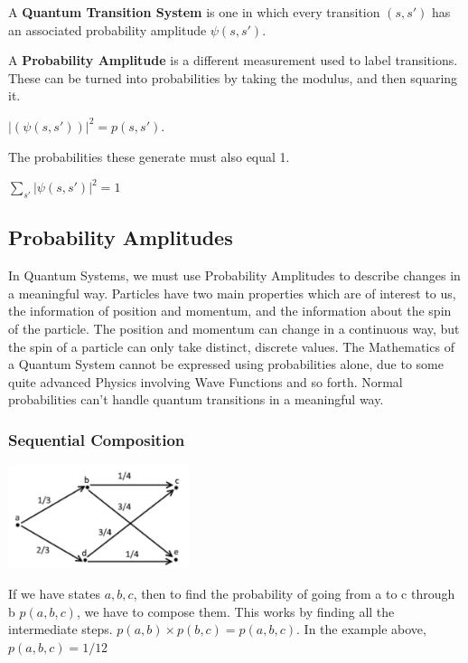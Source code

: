 \documentclass[12pt]{article}
\begin{document}
A \textbf{Quantum Transition System} is one in which every transition $(s, s')$ has an associated probability amplitude $\psi(s, s')$.

A \textbf{Probability Amplitude} is a different measurement used to label transitions. These can be turned into probabilities by taking the modulus, and then squaring it. 

\begin{center}
	$\lvert (\psi(s, s')) \rvert^2 = p(s, s')$. 
\end{center}

The probabilities these generate must also equal 1.

\begin{center}
	$\sum_{s'} \lvert \psi(s,s') \rvert^2 = 1$
\end{center}

\subsection{Probability Amplitudes}

In Quantum Systems, we must use Probability Amplitudes to describe changes in a meaningful way. Particles have two main properties which are of interest to us, the information of position and momentum, and the information about the spin of the particle. The position and momentum can change in a continuous way, but the spin of a particle can only take distinct, discrete values. The Mathematics of a Quantum System cannot be expressed using probabilities alone, due to some quite advanced Physics involving Wave Functions and so forth. Normal probabilities can't handle quantum transitions in a meaningful way.

\subsubsection{Sequential Composition}

\begin{center}
	\includegraphics[width=200px]{Fig1}
\end{center}

If we have states $a, b, c$, then to find the probability of going from a to c through b $p(a, b, c)$, we have to compose them. This works by finding all the intermediate steps. $p(a, b) \times p(b, c) = p(a, b, c)$. In the example above, $p(a, b, c) = 1/12$
\end{document}
